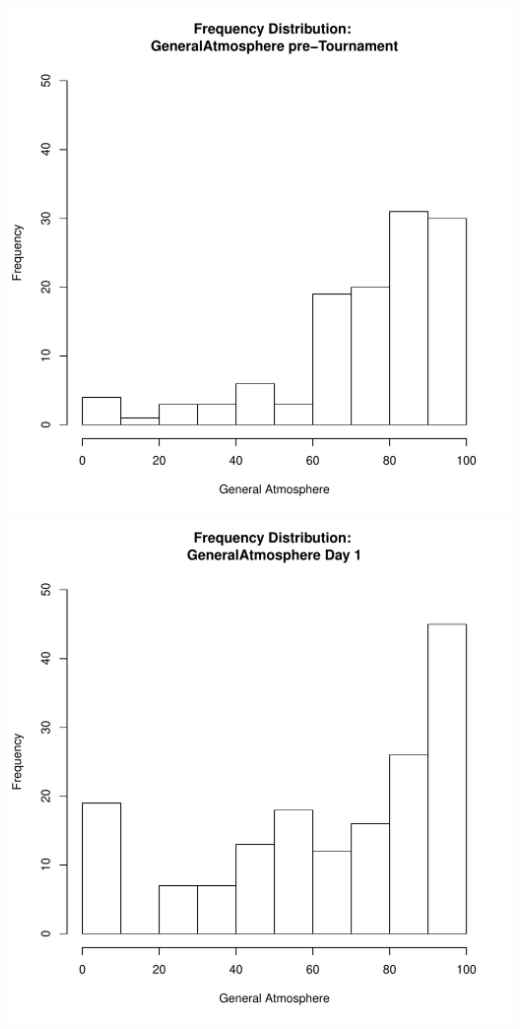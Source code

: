 \documentclass[12pt]{report}
\begin{document}
\clearpage
\includegraphics[scale =.4]{../images/distGeneralAtmospherePre.pdf}
\includegraphics[scale =.4]{../images/distGeneralAtmosphereDay1.pdf}
\end{document}
